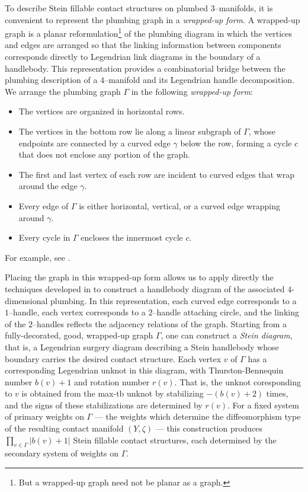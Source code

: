 \documentclass[11pt]{amsart}
\numberwithin{equation}{section}
\theoremstyle{plain}
\theoremstyle{definition}
\theoremstyle{remark}\newtheorem{rem}[equation]{Remark}%
\theoremstyle{remark}\newtheorem{obs}[equation]{Observation}%
\begin{document}
To describe Stein fillable contact structures on plumbed $3$–manifolds, it is convenient to represent the plumbing graph in a \emph{wrapped-up form}. A wrapped-up graph is a planar reformulation\footnote{But a wrapped-up graph need not be planar as a graph.} of the plumbing diagram in which the vertices and edges are arranged so that the linking information between components corresponds directly to Legendrian link diagrams in the boundary of a handlebody. This representation provides a combinatorial bridge between the plumbing description of a $4$–manifold and its Legendrian handle decomposition.
We arrange the plumbing graph $\Gamma$ in the following \emph{wrapped-up form}:
\begin{itemize}
    \item The vertices are organized in horizontal rows.
    \item The vertices in the bottom row lie along a linear subgraph of $\Gamma$, whose endpoints are connected by a curved edge $\gamma$ below the row, forming a cycle $c$ that does not enclose any portion of the graph.
    \item The first and last vertex of each row are incident to curved edges that wrap around the edge $\gamma$.
    \item Every edge of $\Gamma$ is either horizontal, vertical, or a curved edge wrapping around $\gamma$.
    \item Every cycle in $\Gamma$ encloses the innermost cycle $c$.
\end{itemize}
For example, see .

Placing the graph in this wrapped-up form allows us to apply directly the techniques developed in \cite{gompf20234} to construct a handlebody diagram of the associated $4$-dimensional plumbing. In this representation, each curved edge corresponds to a $1$–handle, each vertex corresponds to a $2$–handle attaching circle, and the linking of the $2$–handles reflects the adjacency relations of the graph. Starting from a fully-decorated, good, wrapped-up graph $\Gamma$, one can construct a \emph{Stein diagram}, that is, a Legendrian surgery diagram describing a Stein handlebody whose boundary carries the desired contact structure. Each vertex $v$ of $\Gamma$ has a corresponding Legendrian unknot in this diagram, with Thurston-Bennequin number $b(v)+1$ and rotation number $r(v)$.  That is, the unknot coresponding to $v$ is obtained from the max-$\mathrm{tb}$ unknot by stabilizing $-(b(v)+2)$ times, and the signs of these stabilizations are determined by $r(v)$.  For a fixed system of primary weights on $\Gamma$ --- the weights which determine the diffeomorphism type of the resulting contact manifold $(Y,\zeta)$ --- this construction produces $\prod_{v\in\Gamma}|b(v)+1|$ Stein fillable contact structures, each determined by the secondary system of weights on $\Gamma$.
\end{document}
